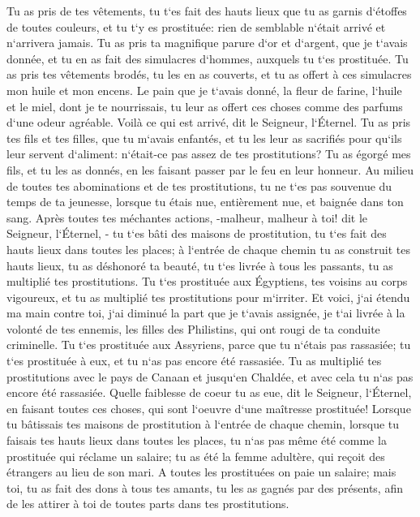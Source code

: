 \verse Tu as pris de tes vêtements, tu t`es fait des hauts lieux que tu as garnis d`étoffes de toutes couleurs, et tu t`y es prostituée: rien de semblable n`était arrivé et n`arrivera jamais. 
\verse Tu as pris ta magnifique parure d`or et d`argent, que je t`avais donnée, et tu en as fait des simulacres d`hommes, auxquels tu t`es prostituée. 
\verse Tu as pris tes vêtements brodés, tu les en as couverts, et tu as offert à ces simulacres mon huile et mon encens. 
\verse Le pain que je t`avais donné, la fleur de farine, l`huile et le miel, dont je te nourrissais, tu leur as offert ces choses comme des parfums d`une odeur agréable. Voilà ce qui est arrivé, dit le Seigneur, l`Éternel. 
\verse Tu as pris tes fils et tes filles, que tu m`avais enfantés, et tu les leur as sacrifiés pour qu`ils leur servent d`aliment: n`était-ce pas assez de tes prostitutions? 
\verse Tu as égorgé mes fils, et tu les as donnés, en les faisant passer par le feu en leur honneur. 
\verse Au milieu de toutes tes abominations et de tes prostitutions, tu ne t`es pas souvenue du temps de ta jeunesse, lorsque tu étais nue, entièrement nue, et baignée dans ton sang. 
\verse Après toutes tes méchantes actions, -malheur, malheur à toi! dit le Seigneur, l`Éternel, - 
\verse tu t`es bâti des maisons de prostitution, tu t`es fait des hauts lieux dans toutes les places; 
\verse à l`entrée de chaque chemin tu as construit tes hauts lieux, tu as déshonoré ta beauté, tu t`es livrée à tous les passants, tu as multiplié tes prostitutions. 
\verse Tu t`es prostituée aux Égyptiens, tes voisins au corps vigoureux, et tu as multiplié tes prostitutions pour m`irriter. 
\verse Et voici, j`ai étendu ma main contre toi, j`ai diminué la part que je t`avais assignée, je t`ai livrée à la volonté de tes ennemis, les filles des Philistins, qui ont rougi de ta conduite criminelle. 
\verse Tu t`es prostituée aux Assyriens, parce que tu n`étais pas rassasiée; tu t`es prostituée à eux, et tu n`as pas encore été rassasiée. 
\verse Tu as multiplié tes prostitutions avec le pays de Canaan et jusqu`en Chaldée, et avec cela tu n`as pas encore été rassasiée. 
\verse Quelle faiblesse de coeur tu as eue, dit le Seigneur, l`Éternel, en faisant toutes ces choses, qui sont l`oeuvre d`une maîtresse prostituée! 
\verse Lorsque tu bâtissais tes maisons de prostitution à l`entrée de chaque chemin, lorsque tu faisais tes hauts lieux dans toutes les places, tu n`as pas même été comme la prostituée qui réclame un salaire; 
\verse tu as été la femme adultère, qui reçoit des étrangers au lieu de son mari. 
\verse A toutes les prostituées on paie un salaire; mais toi, tu as fait des dons à tous tes amants, tu les as gagnés par des présents, afin de les attirer à toi de toutes parts dans tes prostitutions. 
